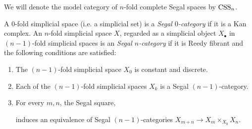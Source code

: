 \documentclass{amsart}
\begin{document}
\noindent We will denote the model category of $n$-fold complete Segal spaces by $\mathrm{CSS}_n$.  

\begin{definition}
	A $0$-fold simplicial space (i.e. a simplicial set) is a {\em  Segal $0$-category} if it is a Kan complex. An $n$-fold simplicial space $X$, regarded as a simplicial object $X_\bullet$ in $(n-1)$-fold simplicial spaces is an {\em Segal $n$-category} if it is Reedy fibrant and the following conditions are satisfied:
		\begin{enumerate}
			\item The $(n-1)$-fold simplicial space $X_0$ is constant and discrete.
			\item Each of the $(n-1)$-fold simplicial spaces $X_k$ is a  Segal $(n-1)$-category.
			\item For every $m, n$, the Segal square,
			\begin{center}
			\end{center}
			induces an equivalence of  Segal $(n-1)$-categories $X_{m+n} \to X_m \times_{X_0} X_n$.  
				\end{enumerate}
\end{definition}
\end{document}
